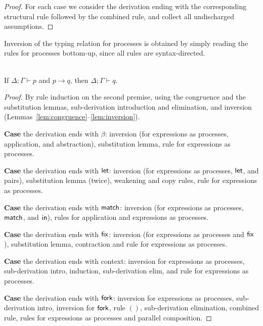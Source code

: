 %
\begin{proof}
  For each case we consider the derivation ending with the
  corresponding structural rule followed by the combined rule, and
  collect all undischarged assumptions.
\end{proof}

Inversion of the typing relation for processes is obtained by simply
reading the rules for processes bottom-up, since all rules are
syntax-directed.

\begin{theorem}[Soundness]
  \label{thm:soundness}~\\
  If $\Delta;\Gamma \vdash p$ and $p \rightarrow q$, then
  $\Delta;\Gamma \vdash q$.
\end{theorem}
%
\begin{proof}
  By rule induction on the second premise, using the congruence and
  the substitution lemmas, sub-derivation introduction and
  elimination, and inversion
  (Lemmas~\ref{lem:congruence}--\ref{lem:inversion}).


  \textbf{Case} the derivation ends with $\beta$: inversion (for
  expressions as processes, application, and abstraction),
  substitution lemma, rule for expressions as processes.

  \textbf{Case} the derivation ends with $\mathsf{let}$: inversion (for
  expressions as processes, $\mathsf{let}$, and pairs), substitution lemma
  (twice), weakening and copy rules, rule for expressions as
  processes.

  \textbf{Case} the derivation ends with $\mathsf{match}$: inversion (for
  expressions as processes, $\mathsf{match}$, and $\mathsf{in}$), rules for
  application and expressions as processes.

  \textbf{Case} the derivation ends with $\mathsf{fix}$: inversion (for
  expressions as processes and $\mathsf{fix}$), substitution lemma, 
  contraction and rule for expressions as processes.

  \textbf{Case} the derivation ends with context: inversion for
  expressions as processes, sub-derivation intro, induction,
  sub-derivation elim, and rule for expressions as processes.

  \textbf{Case} the derivation ends with $\mathsf{fork}$: inversion for
  expressions as processes, sub-derivation intro, inversion for
  $\mathsf{fork}$, rule $()$, sub-derivation elimination, combined rule,
  rules for expressions as processes and parallel composition.


\end{proof}
